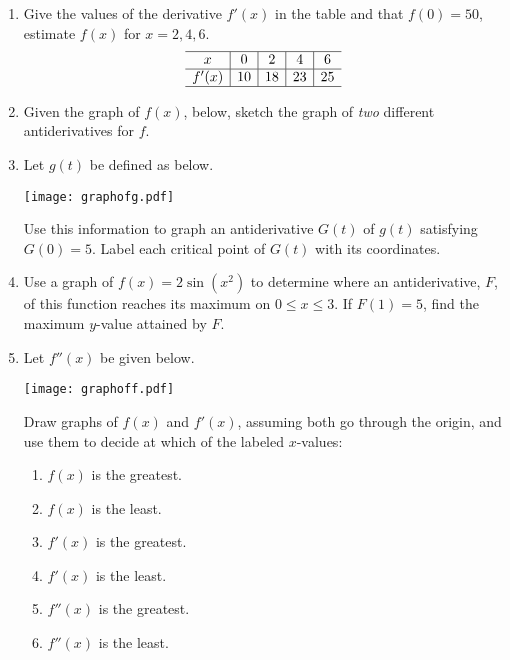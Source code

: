 \documentclass[11pt]{article}
\begin{document}
\drawtitle

\begin{enumerate}

\item Give the values of the derivative $f'(x)$ in the table and that
  $f(0)=50$, estimate $f(x)$ for $x=2,4,6$.
  \[
    \begin{array}{c|c|c|c|c}
      \hline
      x & 0 & 2 & 4 & 6\\
      \hline
      f'(x) & 10 & 18 & 23 & 25 \\
      \hline
   \end{array}
    \]

   \vfill

  \item Given the graph of $f(x)$, below, sketch the graph of
    \emph{two} different antiderivatives for $f$.
    \begin{center}
  \end{center}

\newpage

\item Let $g(t)$ be defined as below.
  \begin{center}
    \texttt{[image: graphofg.pdf]}
  \end{center}
  Use this information to graph an antiderivative $G(t)$ of $g(t)$
  satisfying $G(0)=5$.  Label each critical point of $G(t)$ with its
  coordinates.

  \vfill

\item Use a graph of $f(x)=2\sin(x^2)$ to determine where an
  antiderivative, $F$, of this function reaches its maximum on $0\leq
  x\leq 3$. If $F(1)=5$, find the maximum $y$-value attained by $F$.

  \vfill

  \newpage

\item Let $f''(x)$ be given below.
  \begin{center}
    \texttt{[image: graphoff.pdf]}
  \end{center}
  Draw graphs of $f(x)$ and $f'(x)$, assuming both go through the
  origin, and use them to decide at which of the labeled $x$-values:
  \begin{enumerate}
  \item $f(x)$ is the greatest.
    \vfill
  \item $f(x)$ is the least.
    \vfill
  \item $f'(x)$ is the greatest.
    \vfill
  \item $f'(x)$ is the least.
    \vfill
  \item $f''(x)$ is the greatest.
    \vfill
  \item $f''(x)$ is the least.
    \vfill
  \end{enumerate}


\end{enumerate}
\end{document}
